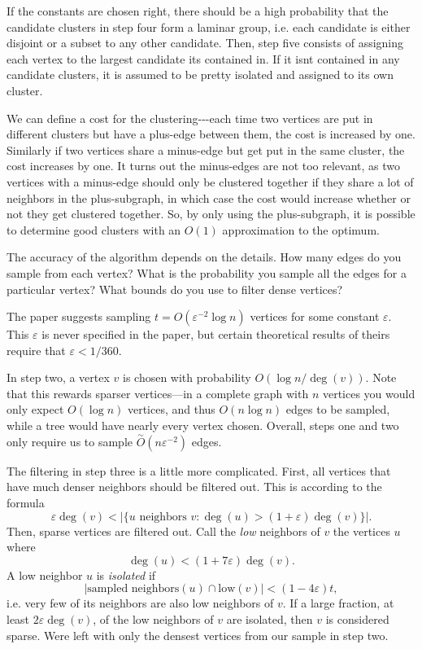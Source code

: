 \documentclass[
]{article}
\begin{document}
If the constants are chosen right, there should be a high probability
that the candidate clusters in step four form a laminar group, i.e. each
candidate is either disjoint or a subset to any other candidate. Then,
step five consists of assigning each vertex to the largest candidate
it\textquotesingle s contained in. If it isn\textquotesingle t contained
in any candidate clusters, it is assumed to be pretty isolated and
assigned to its own cluster.

We can define a cost for the clustering-\/-\/-each time two vertices are
put in different clusters but have a plus-edge between them, the cost is
increased by one. Similarly if two vertices share a minus-edge but get
put in the same cluster, the cost increases by one. It turns out the
minus-edges are not too relevant, as two vertices with a minus-edge
should only be clustered together if they share a lot of neighbors in
the plus-subgraph, in which case the cost would increase whether or not
they get clustered together. So, by only using the plus-subgraph, it is
possible to determine good clusters with an {\(O(1)\)} approximation to
the optimum.

The accuracy of the algorithm depends on the details. How many edges do
you sample from each vertex? What is the probability you sample all the
edges for a particular vertex? What bounds do you use to filter dense
vertices?

The paper suggests sampling {\(t = O(\varepsilon^{- 2}\log n)\)}
vertices for some constant {\(\varepsilon\)}. This {\(\varepsilon\)} is
never specified in the paper, but certain theoretical results of theirs
require that {\(\varepsilon < 1/360\)}.

In step two, a vertex {\(v\)} is chosen with probability
{\(O(\log n/\deg(v))\)}. Note that this rewards sparser vertices---in a
complete graph with {\(n\)} vertices you would only expect
{\(O(\log n)\)} vertices, and thus {\(O(n\log n)\)} edges to be sampled,
while a tree would have nearly every vertex chosen. Overall, steps one
and two only require us to sample
{\(\overset{\sim}{O}(n\varepsilon^{- 2})\)} edges.

The filtering in step three is a little more complicated. First, all
vertices that have much denser neighbors should be filtered out. This is
according to the formula
{\[\varepsilon\deg(v) < |\{ u\text{~neighbors~}v:\deg(u) > (1 + \varepsilon)\deg(v)\}|.\]}Then,
sparse vertices are filtered out. Call the \emph{low} neighbors of
{\(v\)} the vertices {\(u\)} where
{\[\deg(u) < (1 + 7\varepsilon)\deg(v).\]}A low neighbor {\(u\)} is
\emph{isolated} if
{\[|\text{sampled\ neighbors}(u) \cap \text{low}(v)| < (1 - 4\varepsilon)t,\]}i.e.
very few of its neighbors are also low neighbors of {\(v\)}. If a large
fraction, at least {\(2\varepsilon\deg(v)\)}, of the low neighbors of
{\(v\)} are isolated, then {\(v\)} is considered sparse.
We\textquotesingle re left with only the densest vertices from our
sample in step two.
\end{document}
